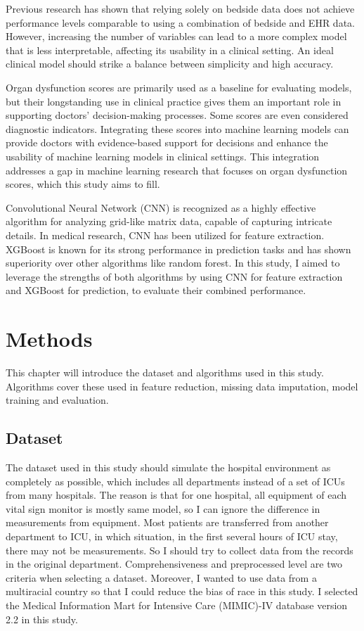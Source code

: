 \documentclass[12pt,a4paper,english
]{tunithesis}
\begin{document}
Previous research has shown that relying solely on bedside data does not achieve performance levels comparable to using a combination of bedside and EHR data. However, increasing the number of variables can lead to a more complex model that is less interpretable, affecting its usability in a clinical setting. An ideal clinical model should strike a balance between simplicity and high accuracy. 

Organ dysfunction scores are primarily used as a baseline for evaluating models, but their longstanding use in clinical practice gives them an important role in supporting doctors' decision-making processes. Some scores are even considered diagnostic indicators. Integrating these scores into machine learning models can provide doctors with evidence-based support for decisions and enhance the usability of machine learning models in clinical settings. This integration addresses a gap in machine learning research that focuses on organ dysfunction scores, which this study aims to fill. 

Convolutional Neural Network (CNN) is recognized as a highly effective algorithm for analyzing grid-like matrix data, capable of capturing intricate details. In medical research, CNN has been utilized for feature extraction. XGBoost is known for its strong performance in prediction tasks and has shown superiority over other algorithms like random forest. In this study, I aimed to leverage the strengths of both algorithms by using CNN for feature extraction and XGBoost for prediction, to evaluate their combined performance. 


\chapter{Methods}
\label{ch:methods}
This chapter will introduce the dataset and algorithms used in this study. Algorithms cover these used in feature reduction, missing data imputation, model training and evaluation.

\section{Dataset}
The dataset used in this study should simulate the hospital environment as completely as possible, which includes all departments instead of a set of ICUs from many hospitals. The reason is that for one hospital, all equipment of each vital sign monitor is mostly same model, so I can ignore the difference in measurements from equipment. Most patients are transferred from another department to ICU, in which situation, in the first several hours of ICU stay, there may not be measurements. So I should try to collect data from the records in the original department. Comprehensiveness and preprocessed level are two criteria when selecting a dataset. Moreover, I wanted to use data from a multiracial country so that I could reduce the bias of race in this study. I selected the Medical Information Mart for Intensive Care (MIMIC)-IV database version 2.2 \parencite{johnson2023} in this study. 
\end{document}
